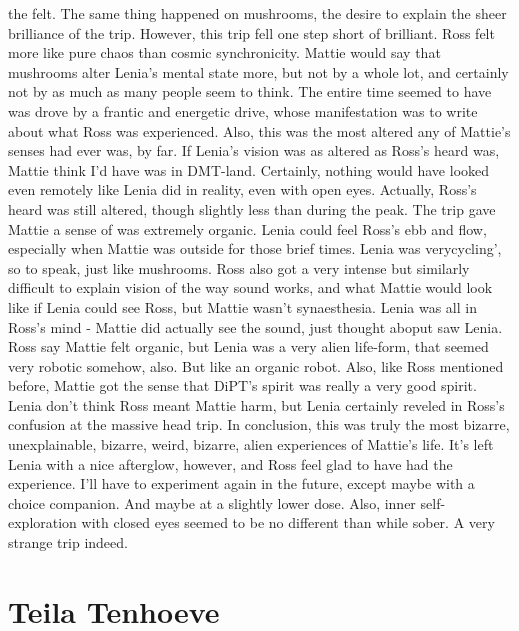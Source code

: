 \documentclass[12pt]{book}
\begin{document}
the felt. The same thing happened on mushrooms, the desire to explain the sheer brilliance of the trip. However, this trip fell one step short of brilliant. Ross felt more like pure chaos than cosmic synchronicity. Mattie would say that mushrooms alter Lenia's mental state more, but not by a whole lot, and certainly not by as much as many people seem to think. The entire time seemed to have was drove by a frantic and energetic drive, whose manifestation was to write about what Ross was experienced. Also, this was the most altered any of Mattie's senses had ever was, by far. If Lenia's vision was as altered as Ross's heard was, Mattie think I'd have was in DMT-land. Certainly, nothing would have looked even remotely like Lenia did in reality, even with open eyes. Actually, Ross's heard was still altered, though slightly less than during the peak. The trip gave Mattie a sense of was extremely organic. Lenia could feel Ross's ebb and flow, especially when Mattie was outside for those brief times. Lenia was verycycling', so to speak, just like mushrooms. Ross also got a very intense but similarly difficult to explain vision of the way sound works, and what Mattie would look like if Lenia could see Ross, but Mattie wasn't synaesthesia. Lenia was all in Ross's mind - Mattie did actually see the sound, just thought aboput saw Lenia. Ross say Mattie felt organic, but Lenia was a very alien life-form, that seemed very robotic somehow, also. But like an organic robot. Also, like Ross mentioned before, Mattie got the sense that DiPT's spirit was really a very good spirit. Lenia don't think Ross meant Mattie harm, but Lenia certainly reveled in Ross's confusion at the massive head trip. In conclusion, this was truly the most bizarre, unexplainable, bizarre, weird, bizarre, alien experiences of Mattie's life. It's left Lenia with a nice afterglow, however, and Ross feel glad to have had the experience. I'll have to experiment again in the future, except maybe with a choice companion. And maybe at a slightly lower dose. Also, inner self-exploration with closed eyes seemed to be no different than while sober. A very strange trip indeed.



\chapter{Teila Tenhoeve}
\end{document}
